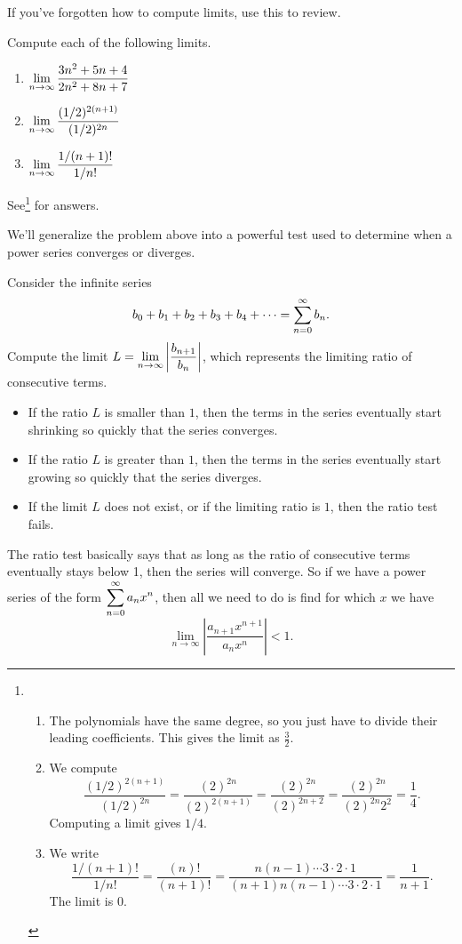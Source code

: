 If you've forgotten how to compute limits, use this to review.

\begin{review*}
 Compute each of the following limits.
\begin{multicols}{3}
 \begin{enumerate}
 \item $\displaystyle \lim_{n\to\infty}\frac{3n^2+5n+4}{2n^2+8n+7}$
 \item $\displaystyle \lim_{n\to\infty}\frac{(1/2)^{2(n+1)}}{(1/2)^{2n}}$
 \item $\displaystyle \lim_{n\to\infty}\frac{1/(n+1)!}{1/n!}$
\end{enumerate}
\end{multicols}
See\footnote{
\begin{enumerate}
 \item The polynomials have the same degree, so you just have to divide their leading coefficients.  This gives the limit as $\frac{3}{2}$. 
 \item We compute $$\frac{(1/2)^{2(n+1)}}{(1/2)^{2n}} = \frac{(2)^{2n}}{(2)^{2(n+1)}} = \frac{(2)^{2n}}{(2)^{2n+2}} = \frac{(2)^{2n}}{(2)^{2n}2^2} = \frac{1}{4}.$$ Computing a limit gives $1/4$.
 \item We write $$\frac{1/(n+1)!}{1/n!} = \frac{(n)!}{(n+1)!} = \frac{n(n-1)\cdots 3\cdot 2\cdot 1}{(n+1)n(n-1)\cdots 3\cdot 2\cdot 1} =\frac{1}{n+1}.$$ The limit is 0.
\end{enumerate}

} for answers.
\end{review*}



We'll generalize the problem above into a powerful test used to determine when a power series converges or diverges.
\begin{theorem}
 Consider the infinite series $$b_0+b_1+b_2+b_3+b_4 +\cdots = \displaystyle\sum_{n=0}^\infty b_n.$$  
 Compute the limit $L = \displaystyle\lim_{n\to\infty}\left|\frac{b_{n+1}}{b_n}\right|$, which represents the limiting ratio of consecutive terms. 
\begin{itemize}
 \item If the ratio $L$ is smaller than $1$, then the terms in the series eventually start shrinking so quickly that the series converges.
 \item If the ratio $L$ is greater than $1$, then the terms in the series eventually start growing so quickly that the series diverges.
 \item If the limit $L$ does not exist, or if the limiting ratio is $1$, then the ratio test fails. 
\end{itemize}
\end{theorem}
The ratio test basically says that as long as the ratio of consecutive terms eventually stays below 1, then the series will converge. So if we have a power series of the form $\displaystyle\sum_{n=0}^\infty a_n x^n$, then all we need to do is find for which $x$ we have $$ \lim_{n\to\infty}\left|\frac{a_{n+1}x^{n+1}}{a_nx^n}\right|<1.$$ 


